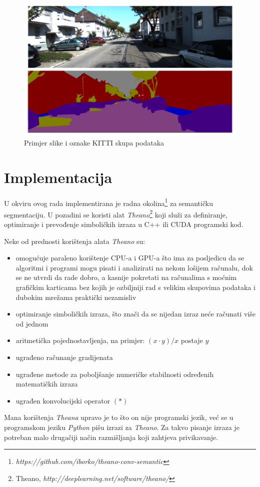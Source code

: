 \documentclass[times, utf8, diplomski, numeric]{fer}
\begin{document}
\begin{figure}[htb]
\centering
\includegraphics[width=\textwidth]{imgs/kitti-example.png}
\caption{Primjer slike i oznake KITTI skupa podataka}
\label{fig:kitti_example}
\end{figure}

\chapter{Implementacija}

U okviru ovog rada implementirana je radna okolina\footnote{\emph{https://github.com/iborko/theano-conv-semantic}}  za semantičku segmentaciju. U pozadini se koristi alat \textit{Theano}\footnote{Theano, \emph{http://deeplearning.net/software/theano/}} \cite{Theano-2012} \cite{Theano-2010} koji služi za definiranje, optimiranje i prevođenje simboličkih izraza u C++ ili CUDA programski kod.

Neke od prednosti korištenja alata \textit{Theano} su:
\begin{itemize}
	\item omogućuje paraleno korištenje CPU-a i GPU-a što ima za posljedicu da se algoritmi i programi mogu pisati i analizirati na nekom lošijem računalu, dok se ne utvrdi da rade dobro, a kasnije pokretati na računalima s moćnim grafičkim karticama bez kojih je ozbiljniji rad s velikim skupovima podataka i dubokim mrežama praktički nezamisliv
    \item optimiranje simboličkih izraza, što znači da se nijedan izraz neće računati više od jednom
    \item aritmetička pojednostavljenja, na primjer: $(x \cdot y)/x$ postaje $y$
    \item ugrađeno računanje gradijenata
    \item ugrađene metode za poboljšanje numeričke stabilnosti određenih matematičkih izraza
    \item ugrađen konvolucijski operator $\left( * \right)$
\end{itemize}
Mana korištenja \textit{Theana} upravo je to što on nije programski jezik, već se u programskom jeziku \textit{Python} pišu izrazi za \textit{Theano}. Za takvo pisanje izraza je potreban malo drugačiji način razmišljanja koji zahtjeva privikavanje.
\end{document}
